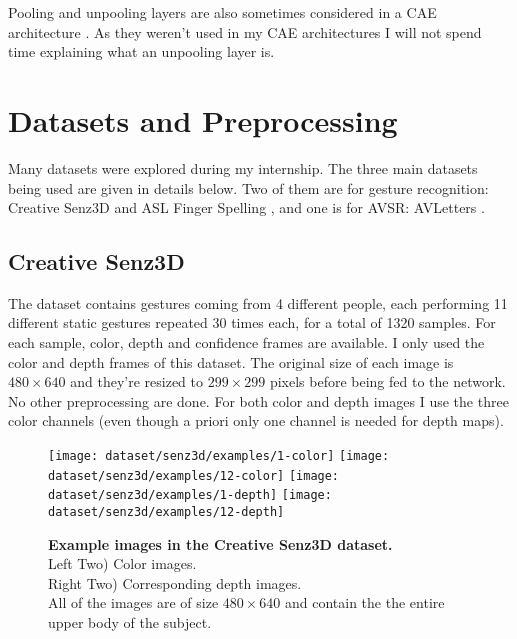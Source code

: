 Pooling and unpooling layers are also sometimes considered in a CAE
architecture \cite{V. Turchenko 2017}. As they weren't used
in my CAE architectures I will not spend time explaining what an unpooling
layer is.

\section{Datasets and Preprocessing} \label{section:dataset}

Many datasets were explored during my internship. The three main datasets
being used are given in details  below. Two of them are for gesture
recognition:
Creative Senz3D \cite{A. Memo 2015, A. Memo 2017} and ASL Finger Spelling
\cite{N. Pugeault 2011}, and one is for AVSR: AVLetters
\cite{I. Matthews 2002}.

\subsection{Creative Senz3D}

The dataset contains gestures coming from 4 different people, each
performing 11 different static gestures repeated 30 times each,
for a total of 1320 samples.
For each sample, color, depth and confidence frames are available.
I only used the color and depth frames of this dataset. The original
size of each image is $480 \times 640$ and they're resized to
$299 \times 299$ pixels before being fed to the network. No other
preprocessing are done. For both color and depth images I use the three
color channels (even though a priori only one channel is needed for
depth maps).

\begin{figure}[H]
  \centering
  \hfill
  \texttt{[image: dataset/senz3d/examples/1-color]}
  \hfill
  \texttt{[image: dataset/senz3d/examples/12-color]}
  \hfill
  \texttt{[image: dataset/senz3d/examples/1-depth]}
  \hfill
  \texttt{[image: dataset/senz3d/examples/12-depth]}
  \caption{%
    \textbf{Example images in the Creative Senz3D dataset.}\\[0.1em]
    Left Two) Color images.\\[0.1em]
    Right Two) Corresponding depth images.\\[0.1em]
    All of the images are of size $480 \times 640$ and contain the
      the entire upper body of the subject.}
  \label{fig:senz3d_exs}
\end{figure}

